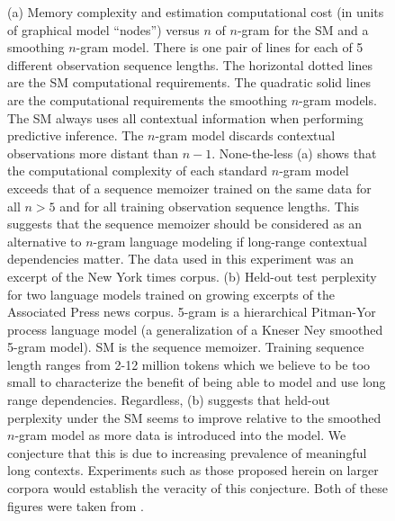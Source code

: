 \documentclass[10pt]{article}
\begin{document}
\begin{figure}[htbp]
\begin{center}
\hspace{1.5cm}
\caption{(a)  Memory complexity and estimation computational cost (in units of graphical model ``nodes'') versus $n$ of $n$-gram for the SM and a smoothing $n$-gram model.  There is one pair of lines for each of 5 different observation sequence lengths.  The horizontal dotted lines are the SM computational requirements.  The quadratic solid lines are the computational requirements the  smoothing $n$-gram models.  The SM always uses all contextual information when performing predictive inference.  The $n$-gram model discards contextual observations more distant than $n-1$.  None-the-less (a) shows that the computational complexity of each standard $n$-gram model exceeds that of a sequence memoizer trained on the same data for all $n>5$ and for all training observation sequence lengths.  This suggests that the sequence memoizer should be considered as an alternative to $n$-gram language modeling if long-range contextual dependencies matter.  The data used in this experiment was an excerpt of the New York times corpus.  (b)  Held-out test perplexity for two language models trained on growing excerpts of the Associated Press news corpus.  5-gram is a hierarchical Pitman-Yor process language model (a generalization of a Kneser Ney smoothed 5-gram model).  SM is the sequence memoizer.  Training sequence length ranges from 2-12 million tokens which we believe to be too small to characterize the benefit of being able to model and use long range dependencies.  Regardless, (b) suggests that held-out perplexity under the SM seems to improve relative to the smoothed $n$-gram model as more data is introduced into the model.  We conjecture that this is due to increasing prevalence of meaningful long contexts.  Experiments such as those proposed herein on larger corpora would establish the veracity of this conjecture.  Both of these figures were taken from \cite{Wood2009}.}

\end{center}
\end{figure}
\end{document}

